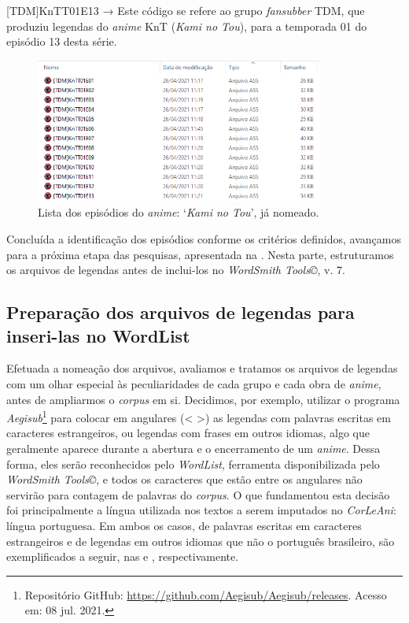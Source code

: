 \documentclass[portuguese]{textolivre}
\begin{document}
[TDM]KnTT01E13 → Este código se refere ao grupo \textit{fansubber} TDM, que produziu legendas do \textit{anime} KnT (\textit{Kami no Tou}), para a temporada 01 do episódio 13 desta série. 

\begin{figure}[htbp]
 \centering
 \includegraphics[width=0.85\textwidth]{Fig9.png}
 \caption{Lista dos episódios do \textit{anime}: ‘\textit{Kami no Tou}’, já nomeado.}
 \label{fig09}
\end{figure}

Concluída a identificação dos episódios conforme os critérios definidos, avançamos para a próxima etapa das pesquisas, apresentada na . Nesta parte, estruturamos os arquivos de legendas antes de inclui-los no \textit{WordSmith Tools©}, v. 7.

\subsection{Preparação dos arquivos de legendas para inseri-las no WordList}\label{sec-titulo}
Efetuada a nomeação dos arquivos, avaliamos e tratamos os arquivos de legendas com um olhar especial às peculiaridades de cada grupo e cada obra de \textit{anime}, antes de ampliarmos o \textit{corpus} em si. Decidimos, por exemplo, utilizar o programa \textit{Aegisub}\footnote{Repositório GitHub: \url{https://github.com/Aegisub/Aegisub/releases}. Acesso em: 08 jul. 2021.} para colocar em angulares (< >) as legendas com palavras escritas em caracteres estrangeiros, ou legendas com frases em outros idiomas, algo que geralmente aparece durante a abertura e o encerramento de um \textit{anime}. Dessa forma, eles serão reconhecidos pelo \textit{WordList}, ferramenta disponibilizada pelo \textit{WordSmith Tools©}, e todos os caracteres que estão entre os angulares não servirão para contagem de palavras do \textit{corpus}. O que fundamentou esta decisão foi principalmente a língua utilizada nos textos a serem imputados no \textit{CorLeAni}: língua portuguesa. Em ambos os casos, de palavras escritas em caracteres estrangeiros e de legendas em outros idiomas que não o português brasileiro, são exemplificados a seguir, nas  e , respectivamente.
\end{document}
